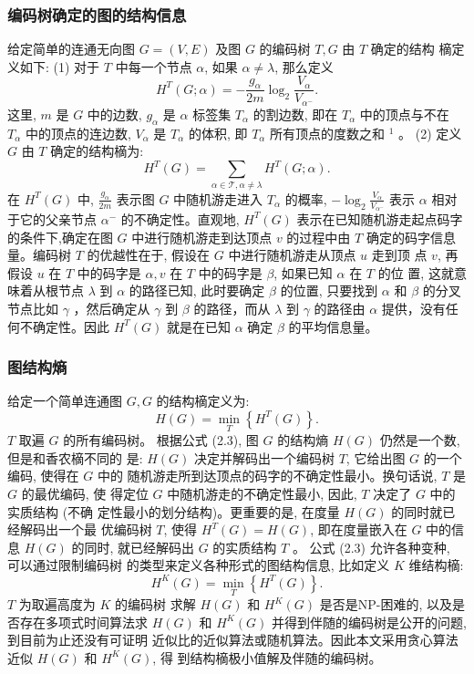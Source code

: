 \documentclass[a4paper]{apa6}
\begin{document}
\subsubsection{编码树确定的图的结构信息}
\label{sec:org5af46dd}
给定简单的连通无向图 \(G=(V, E)\) 及图 \(G\) 的编码树 \(T, G\) 由 \(T\) 确定的结构 樀定义如下:
(1) 对于 \(T\) 中每一个节点 \(\alpha\), 如果 \(\alpha \neq \lambda\), 那么定义
$$
H^{T}(G ; \alpha)=-\frac{g_{\alpha}}{2 m} \log _{2} \frac{V_{\alpha}}{V_{\alpha^{-}}} .
$$
这里, \(m\) 是 \(G\) 中的边数, \(g_{\alpha}\) 是 \(\alpha\) 标签集 \(T_{\alpha}\) 的割边数, 即在 \(T_{\alpha}\) 中的顶点与不在 \(T_{\alpha}\) 中的顶点的连边数, \(V_{\alpha}\) 是 \(T_{\alpha}\) 的体积, 即 \(T_{\alpha}\) 所有顶点的度数之和 \({ }^{1}\) 。
(2) 定义 \(G\) 由 \(T\) 确定的结构樀为:
$$
H^{T}(G)=\sum_{\alpha \in \mathcal{T}, \alpha \neq \lambda} H^{T}(G ; \alpha) .
$$
在 \(H^{T}(G)\) 中, \(\frac{g_{\alpha}}{2 m}\) 表示图 \(G\) 中随机游走进入 \(T_{\alpha}\) 的概率, \(-\log_{2} \frac{V_{\alpha}}{V_{\alpha^{-}}}\) 表示 \(\alpha\) 相对于它的父亲节点 \(\alpha^{-}\) 的不确定性。直观地, \(H^{T}(G)\) 表示在已知随机游走起点码字的条件下,确定在图 \(G\) 中进行随机游走到达顶点 \(v\) 的过程中由 \(T\) 确定的码字信息量。编码树 \(T\) 的优越性在于, 假设在 \(G\) 中进行随机游走从顶点 \(u\) 走到顶 点 \(v\), 再假设 \(u\) 在 \(T\) 中的码字是 \(\alpha, v\) 在 \(T\) 中的码字是 \(\beta\), 如果已知 \(\alpha\) 在 \(T\) 的位 置, 这就意味着从根节点 \(\lambda\) 到 \(\alpha\) 的路径已知, 此时要确定 \(\beta\) 的位置, 只要找到 \(\alpha\) 和 \(\beta\) 的分叉节点比如 \(\gamma\) ，然后确定从 \(\gamma\) 到 \(\beta\) 的路径，而从 \(\lambda\) 到 \(\gamma\) 的路径由 \(\alpha\) 提供，没有任何不确定性。因此 \(H^{T}(G)\) 就是在已知 \(\alpha\) 确定 \(\beta\) 的平均信息量。

\subsubsection{图结构熵}
\label{sec:org57a6d40}
给定一个简单连通图 \(G, G\) 的结构樀定义为:
$$
H(G)=\min _{T}\left\{H^{T}(G)\right\} .
$$
\(T\) 取遍 \(G\) 的所有编码树。
根据公式 (2.3), 图 \(G\) 的结构熵 \(H(G)\) 仍然是一个数, 但是和香农樀不同的 是: \(H(G)\) 决定并解码出一个编码树 \(T\), 它给出图 \(G\) 的一个编码, 使得在 \(G\) 中的 随机游走所到达顶点的码字的不确定性最小。换句话说, \(T\) 是 \(G\) 的最优编码, 使 得定位 \(G\) 中随机游走的不确定性最小, 因此, \(T\) 决定了 \(G\) 中的实质结构 (不确 定性最小的划分结构)。更重要的是, 在度量 \(H(G)\) 的同时就已经解码出一个最 优编码树 \(T\), 使得 \(H^{T}(G)=H(G)\), 即在度量嵌入在 \(G\) 中的信息 \(H(G)\) 的同时, 就已经解码出 \(G\) 的实质结构 \(T\) 。 公式 (2.3) 允许各种变种, 可以通过限制编码树 的类型来定义各种形式的图结构信息, 比如定义 \(K\) 维结构樀:
$$
H^{K}(G)=\min _{T}\left\{H^{T}(G)\right\} .
$$
\(T\) 为取遍高度为 \(K\) 的编码树
求解 \(H(G)\) 和 \(H^{K}(G)\) 是否是NP-困难的, 以及是否存在多项式时间算法求 \(H(G)\) 和 \(H^{K}(G)\) 并得到伴随的编码树是公开的问题, 到目前为止还没有可证明 近似比的近似算法或随机算法。因此本文采用贪心算法近似 \(H(G)\) 和 \(H^{K}(G)\), 得 到结构樀极小值解及伴随的编码树。
\end{document}
